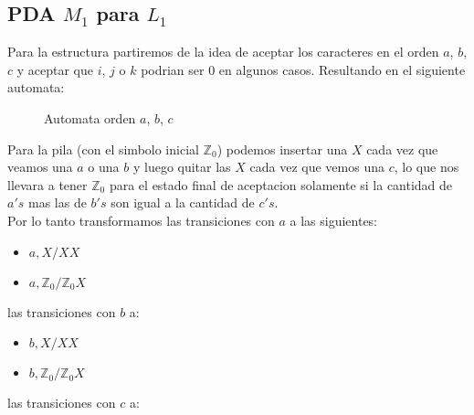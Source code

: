 \documentclass[spanish]{article}
\begin{document}
\subsection{PDA $M_1$ para $L_1$}
  Para la estructura partiremos de la idea de aceptar los caracteres en el orden $a$, $b$, $c$ y
  aceptar que $i$, $j$ o $k$ podrian ser $0$ en algunos casos. Resultando en el siguiente automata:
  \begin{figure}[H]
    \centering
    \label{fig:figura1}
    \caption{Automata orden $a$, $b$, $c$}
  \end{figure}
  Para la pila (con el simbolo inicial $\mathbb{Z}_0$) podemos insertar una $X$ cada vez que veamos una $a$ o una $b$ y
  luego quitar las $X$ cada vez que vemos una $c$, lo que nos llevara a tener $\mathbb{Z}_0$ para el estado final de aceptacion
  solamente si la cantidad de $a's$ mas las de $b's$ son igual a la cantidad de $c's$.\\
  Por lo tanto transformamos las transiciones con $a$ a las siguientes:
  \begin{itemize}
    \item $a, X / XX$
    \item $a, \mathbb{Z}_0 / \mathbb{Z}_0 X$
  \end{itemize}
  las transiciones con $b$ a:
  \begin{itemize}
    \item $b, X / XX$
    \item $b, \mathbb{Z}_0 / \mathbb{Z}_0 X$
  \end{itemize}
  las transiciones con $c$ a:
\end{document}
